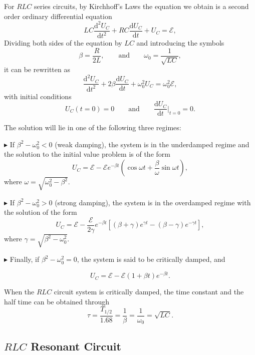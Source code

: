 \documentclass{article}
\begin{document}
For $RLC$ series circuits, by Kirchhoff’s Laws the equation we obtain is a second order ordinary differential equation
$$
    LC\frac{\mathrm{d}^2U_C}{\mathrm{d}t^2} + RC\frac{\mathrm{d}U_C}{\mathrm{d}t} + U_C = \mathcal{E},
$$
Dividing both sides of the equation by $LC$ and introducing the symbols
\begin{equation}\label{EqBeta}
    \beta = \frac{R}{2L},\hspace{2em} \text{and} \hspace{2em}\omega_0 = \frac{1}{\sqrt{LC}},
\end{equation}
it can be rewritten as
$$
    \frac{\mathrm{d}^2U_C}{\mathrm{d}t^2} + 2\beta\frac{\mathrm{d}U_C}{\mathrm{d}t} + \omega_0^2U_C = \omega_0^2\mathcal{E},
$$
with initial conditions
$$U_C(t=0) = 0\hspace{2em} \text{and} \hspace{2em}\frac{\mathrm{d}U_C}{\mathrm{d}t}\bigg|_{t=0} = 0.$$

The solution will lie in one of the following three regimes:

$\blacktriangleright$ If $\beta^2 - \omega_0^2 < 0$ (weak damping), the system is in the underdamped regime and the solution to the initial value problem is of the form
$$U_C = \mathcal{E} - \mathcal{E}e^{-\beta t}(\cos\omega t +\frac{\beta}{\omega}\sin \omega t),$$
where $\omega = \sqrt{\omega_0^2 - \beta^2}$.

$\blacktriangleright$ If $\beta^2 - \omega_0^2 > 0$ (strong damping), the system is in the overdamped regime with the solution of the form
$$U_C = \mathcal{E} - \frac{\mathcal{E}}{2\gamma}e^{-\beta t}[(\beta + \gamma)e^{\gamma t} - (\beta -\gamma)e^{-\gamma t}],$$
where $\gamma = \sqrt{\beta^2 - \omega_0^2}$.

$\blacktriangleright$ Finally, if $\beta^2 - \omega_0^2 = 0$, the system is said to be critically damped, and

$$U_C = \mathcal{E} - \mathcal{E}(1+\beta t)e^{-\beta t}.$$

When the $RLC$ circuit system is critically damped, the time constant and the half time can be obtained through
\begin{equation}
    \tau = \frac{T_{1/2}}{1.68} = \frac{1}{\beta} = \frac{1}{\omega_0} = \sqrt{LC}.
    \label{eq:ThalfRLC}
\end{equation}

\subsection{$RLC$ Resonant Circuit}
\end{document}

